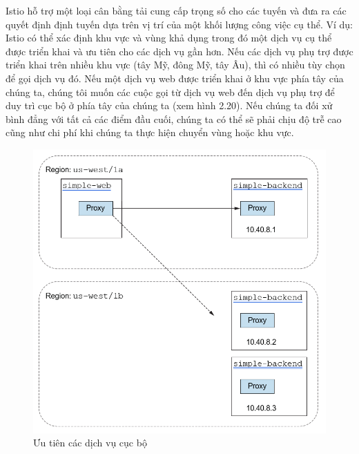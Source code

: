 \documentclass[12pt,a4paper]{report}
\begin{document}
Istio hỗ trợ một loại cân bằng tải cung cấp trọng số cho các tuyến và đưa ra các quyết định định tuyến dựa trên vị trí của một khối lượng công việc cụ thể. Ví dụ: Istio có thể xác định khu vực và vùng khả dụng trong đó một dịch vụ cụ thể được triển khai và ưu tiên cho các dịch vụ gần hơn. Nếu các dịch vụ phụ trợ được triển khai trên nhiều khu vực (tây Mỹ, đông Mỹ, tây Âu), thì có nhiều tùy chọn để gọi dịch vụ đó. Nếu một dịch vụ web được triển khai ở khu vực phía tây của chúng ta, chúng tôi muốn các cuộc gọi từ dịch vụ web đến dịch vụ phụ trợ để duy trì cục bộ ở phía tây của chúng ta (xem hình 2.20). Nếu chúng ta đối xử bình đẳng với tất cả các điểm đầu cuối, chúng ta có thể sẽ phải chịu độ trễ cao cũng như chi phí khi chúng ta thực hiện chuyển vùng hoặc khu vực.
\begin{figure}[h]
	\centering
	\includegraphics[width=0.7\linewidth]{Pics/2.2.3-p3}
	\caption{Ưu tiên các dịch vụ cục bộ}
	\label{fig:2.2.3-3}
\end{figure}
\newpage
\end{document}

